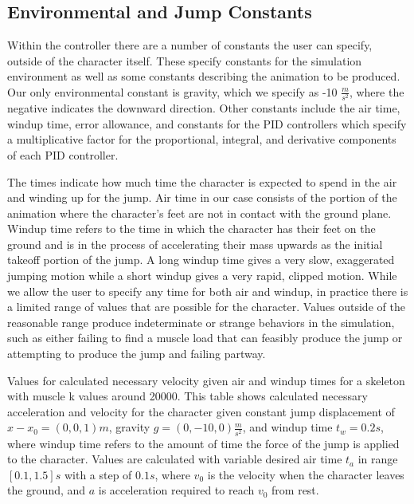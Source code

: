 \subsection{Environmental and Jump Constants}
\label{subsection:user_constants}
Within the controller there are a number of constants the user can specify, outside of the character itself.  These specify constants for the simulation environment as well as some constants describing the animation to be produced.  Our only environmental constant is gravity, which we specify as -10 $\frac{m}{s^2}$, where the negative indicates the downward direction.  Other constants include the air time, windup time, error allowance, and constants for the PID controllers which specify a multiplicative factor for the proportional, integral, and derivative components of each PID controller.

The times indicate how much time the character is expected to spend in the air and winding up for the jump.  Air time in our case consists of the portion of the animation where the character's feet are not in contact with the ground plane.  Windup time refers to the time in which the character has their feet on the ground and is in the process of accelerating their mass upwards as the initial takeoff portion of the jump.  A long windup time gives a very slow, exaggerated jumping motion while a short windup gives a very rapid, clipped motion.  While we allow the user to specify any time for both air and windup, in practice there is a limited range of values that are possible for the character.  Values outside of the reasonable range produce indeterminate or strange behaviors in the simulation, such as either failing to find a muscle load that can feasibly produce the jump or attempting to produce the jump and failing partway.

\begin{table}[ht]
	\centering
	
	\caption[Calculated required velocities for a jump given skeleton and desired air and windup times]{Values for calculated necessary velocity given air and windup times for a skeleton with muscle k values around 20000. This table shows calculated necessary acceleration and velocity for the character given constant jump displacement of $x - x_0 = (0, 0, 1)m$, gravity $g=(0, -10, 0)\frac{m}{s^2}$, and windup time $t_w = 0.2s$, where windup time refers to the amount of time the force of the jump is applied to the character. Values are calculated with variable desired air time $t_a$ in range $[0.1, 1.5]s$ with a step of $0.1s$, where $v_0$ is the velocity when the character leaves the ground, and $a$ is acceleration required to reach $v_0$ from rest.}
\end{table}

